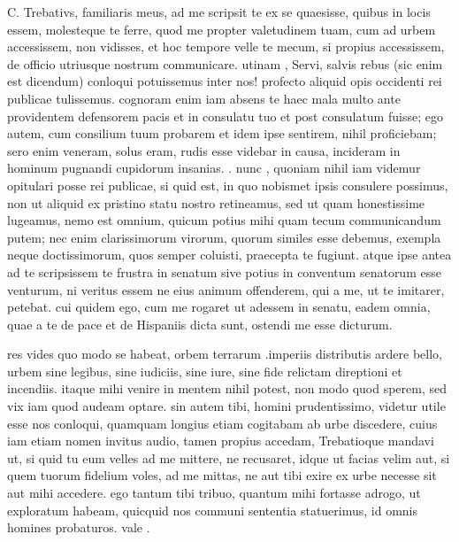 


 C. Trebativs, familiaris meus, ad me scripsit te ex se quaesisse, quibus in locis essem, molesteque te ferre, quod me propter valetudinem tuam, cum ad urbem accessissem, non vidisses, et hoc tempore velle te mecum, si propius accessissem, de officio utriusque nostrum communicare. utinam , Servi, salvis rebus (sic enim est dicendum) conloqui potuissemus inter nos! profecto aliquid opis occidenti rei publicae tulissemus. cognoram enim iam absens te haec mala multo ante providentem defensorem pacis et in consulatu tuo et post consulatum fuisse; ego autem, cum consilium tuum probarem et idem ipse sentirem, nihil proficiebam; sero enim veneram, solus eram, rudis esse videbar in causa, incideram in hominum pugnandi cupidorum insanias. . nunc , quoniam nihil iam videmur opitulari posse rei publicae, si quid est, in quo nobismet ipsis consulere possimus, non ut aliquid ex pristino statu nostro retineamus, sed ut quam honestissime lugeamus, nemo est omnium, quicum potius mihi quam tecum communicandum putem; nec enim clarissimorum virorum, quorum similes esse debemus, exempla neque doctissimorum, quos semper coluisti, praecepta te fugiunt. atque ipse antea ad te scripsissem te frustra in senatum sive potius in conventum senatorum esse venturum, ni veritus essem ne eius animum offenderem, qui a me, ut te imitarer, petebat. cui quidem ego, cum me rogaret ut adessem in senatu, eadem omnia, quae a te de pace et de Hispaniis dicta sunt, ostendi me esse dicturum.

 res vides quo modo se habeat, orbem terrarum .imperiis distributis ardere bello, urbem sine legibus, sine iudiciis, sine iure, sine fide relictam direptioni et incendiis. itaque mihi venire in mentem nihil potest, non modo quod sperem, sed vix iam quod audeam optare. sin autem tibi, homini prudentissimo, videtur utile esse nos conloqui, quamquam longius etiam cogitabam ab urbe discedere, cuius iam etiam nomen invitus audio, tamen propius accedam, Trebatioque mandavi ut, si quid tu eum velles ad me mittere, ne recusaret, idque ut facias velim aut, si quem tuorum fidelium voles, ad me mittas, ne aut tibi exire ex urbe necesse sit aut mihi accedere. ego tantum tibi tribuo, quantum mihi fortasse adrogo, ut exploratum habeam, quicquid nos communi sententia statuerimus, id omnis homines probaturos. vale .
